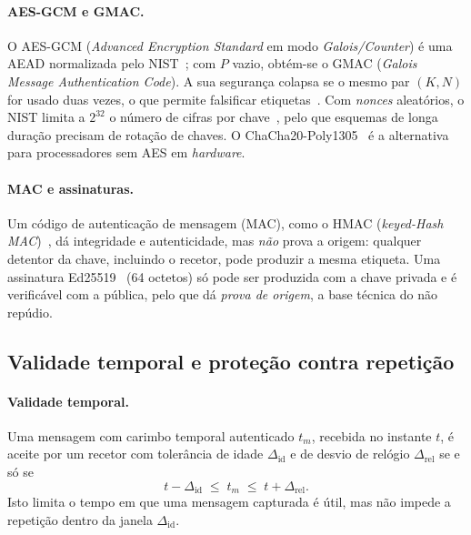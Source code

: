 \paragraph{AES-GCM e GMAC.} O AES-GCM (\emph{Advanced Encryption Standard} em modo
\emph{Galois\slash Counter}) é uma AEAD normalizada pelo NIST~\cite{nist-sp800-38d}; com $P$
vazio, obtém-se o GMAC (\emph{Galois Message Authentication Code}). A sua
segurança colapsa se o mesmo par $(K, N)$ for usado duas vezes, o que permite
falsificar etiquetas~\cite{bock2016nonce}. Com \emph{nonces} aleatórios, o NIST
limita a $2^{32}$ o número de cifras por chave~\cite[§8.3]{nist-sp800-38d}, pelo que
esquemas de longa duração precisam de rotação de chaves. O ChaCha20-Poly1305~\cite{rfc8439} é a
alternativa para processadores sem AES em \emph{hardware}.

\paragraph{MAC e assinaturas.} Um código de autenticação de mensagem (MAC), como o
HMAC (\emph{keyed-Hash MAC})~\cite{rfc2104}, dá integridade e
autenticidade, mas \emph{não} prova a origem: qualquer detentor da chave, incluindo
o recetor, pode produzir a mesma etiqueta. Uma assinatura Ed25519~\cite{bernstein2012ed25519,
rfc8032} (64 octetos) só pode ser produzida com a chave privada e é verificável com
a pública, pelo que dá \emph{prova de origem}, a base técnica do não repúdio.

\subsection{Validade temporal e proteção contra repetição}
\label{sec:validade}

\paragraph{Validade temporal.} Uma mensagem com carimbo temporal autenticado $t_m$,
recebida no instante $t$, é aceite por um recetor com tolerância de idade $\Delta_{\mathrm{id}}$
e de desvio de relógio $\Delta_{\mathrm{rel}}$ se e só se
\begin{equation}
  t - \Delta_{\mathrm{id}} \;\le\; t_m \;\le\; t + \Delta_{\mathrm{rel}} .
  \label{eq:validade}
\end{equation}
Isto limita o tempo em que uma mensagem capturada é útil, mas não impede a
repetição dentro da janela $\Delta_{\mathrm{id}}$.

